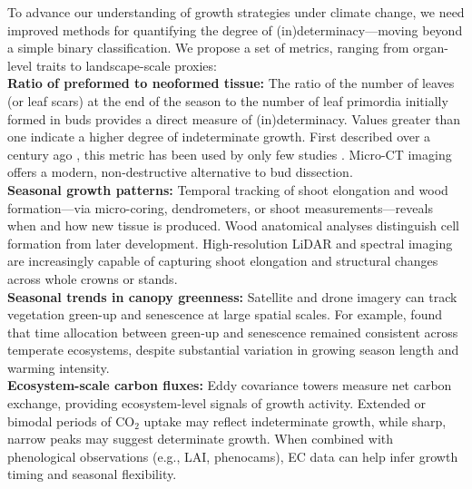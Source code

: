 \documentclass{article}
\begin{document}
	\begin{tcolorbox}[
		colback=gray!5!white,  %
		colframe=black,      %
		coltitle=white,      %
		fonttitle=\bfseries, %
		boxrule=0.5pt,       %
		title=\textbf{Box 1: Metrics of (In)determinacy}
		]
	
		To advance our understanding of growth strategies under climate change, we need improved methods for quantifying the degree of (in)determinacy—moving beyond a simple binary classification. We propose a set of metrics, ranging from organ-level traits to landscape-scale proxies:\\
		

			\textbf{Ratio of preformed to neoformed tissue:} 
			The ratio of the number of leaves (or leaf scars) at the end of the season to the number of leaf primordia initially formed in buds provides a direct measure of (in)determinacy. Values greater than one indicate a higher degree of indeterminate growth. First described over a century ago \citep{mooreStudyWinterBuds1909}, this metric has been used by only few studies \citep{damascosBudCompositionBranching2005, kikuzawaLeafSurvivalWoody1983, guedonRelativeExtentsPreformation2006}. Micro-CT imaging offers a modern, non-destructive alternative to bud dissection.\\
			
			 \textbf{Seasonal growth patterns:} Temporal tracking of shoot elongation and wood formation—via micro-coring, dendrometers, or shoot measurements—reveals when and how new tissue is produced. Wood anatomical analyses distinguish cell formation from later development. High-resolution LiDAR and spectral imaging are increasingly capable of capturing shoot elongation and structural changes across whole crowns or stands.\\
			
			\textbf{Seasonal trends in canopy greenness:} Satellite and drone imagery can track vegetation green-up and senescence at large spatial scales. For example, \citet{mengConsistentTimeAllocation2024} found that time allocation between green-up and senescence remained consistent across temperate ecosystems, despite substantial variation in growing season length and warming intensity.\\
			
			\textbf{Ecosystem-scale carbon fluxes:} Eddy covariance towers measure net carbon exchange, providing ecosystem-level signals of growth activity. Extended or bimodal periods of CO$_2$ uptake may reflect indeterminate growth, while sharp, narrow peaks may suggest determinate growth. When combined with phenological observations (e.g., LAI, phenocams), EC data can help infer growth timing and seasonal flexibility.

	\end{tcolorbox}
	
\end{document}
